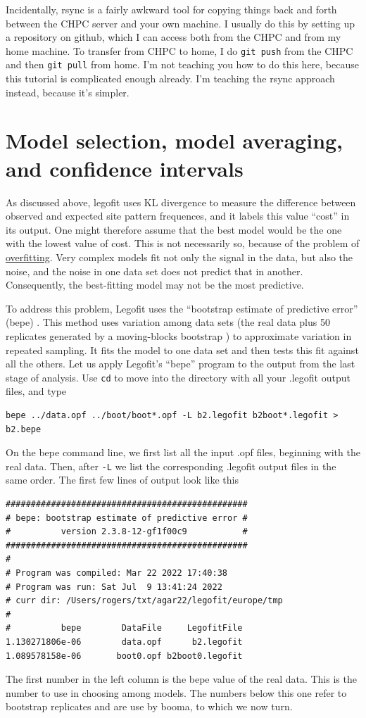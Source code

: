 \documentclass[11pt]{article}
\begin{document}
Incidentally, rsync is a fairly awkward tool for copying things back
and forth between the CHPC server and your own machine. I usually do
this by setting up a repository on github, which I can access both
from the CHPC and from my home machine. To transfer from CHPC to home,
I do \texttt{git push} from the CHPC and then \texttt{git pull} from
home. I'm not teaching you how to do this here, because this tutorial
is complicated enough already. I'm teaching the rsync approach
instead, because it's simpler.

\section{Model selection, model averaging, and confidence intervals}
\label{sec.msma}
As discussed above, legofit uses KL divergence to measure the
difference between observed and expected site pattern frequences, and
it labels this value ``cost'' in its output. One might therefore
assume that the best model would be the one with the lowest value of
cost. This is not necessarily so, because of the problem of
\href{https://en.wikipedia.org/wiki/Overfitting}{overfitting}. Very
complex models fit not only the signal in the data, but also the
noise, and the noise in one data set does not predict that in
another. Consequently, the best-fitting model may not be the most
predictive.

To address this problem, Legofit uses the ``bootstrap estimate of
predictive error'' (bepe)
\citep{Rogers:BMC-20-526,Efron:JAS-78-316,Efron:IB-93}. This method
uses variation among data sets (the real data plus 50 replicates
generated by a moving-blocks bootstrap \citep{Liu:ELB-92-225}) to
approximate variation in repeated sampling. It fits the model to one
data set and then tests this fit against all the others. Let us apply
Legofit's ``bepe'' program to the output from the last stage of
analysis. Use \texttt{cd} to move into the directory with all your
.legofit output files, and type
\begin{verbatim}
bepe ../data.opf ../boot/boot*.opf -L b2.legofit b2boot*.legofit > b2.bepe
\end{verbatim}
On the bepe command line, we first list all the input .opf files,
beginning with the real data. Then, after \texttt{-L} we list the
corresponding .legofit output files in the same order. The first few
lines of output look like this
\begin{verbatim}
################################################
# bepe: bootstrap estimate of predictive error #
#          version 2.3.8-12-gf1f00c9           #
################################################
#
# Program was compiled: Mar 22 2022 17:40:38
# Program was run: Sat Jul  9 13:41:24 2022
# curr dir: /Users/rogers/txt/agar22/legofit/europe/tmp
#
#          bepe        DataFile     LegofitFile
1.130271806e-06        data.opf      b2.legofit
1.089578158e-06       boot0.opf b2boot0.legofit
\end{verbatim}
The first number in the left column is the bepe value of the real
data. This is the number to use in choosing among models. The numbers
below this one refer to bootstrap replicates and are use by booma,
to which we now turn.
\end{document}
